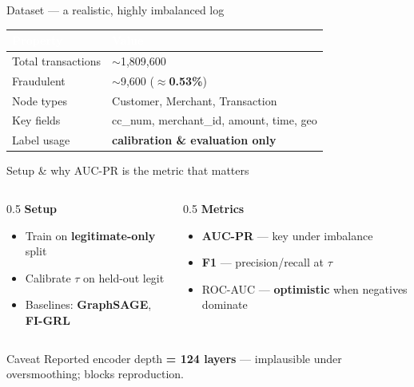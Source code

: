 \documentclass[10pt,aspectratio=169]{beamer}
\newcommand{\hl}[1]{\textcolor{mBlue}{\textbf{#1}}}    %
\newcommand{\bl}[1]{\textcolor{mDark}{\textbf{#1}}}    %
\newcommand{\gr}[1]{\textcolor{mGreen}{\textbf{#1}}}   %
\newcommand{\rd}[1]{\textcolor{mRed}{\textbf{#1}}}     %
\newenvironment{caveat}{\begin{alertblock}{Caveat}}{\end{alertblock}}
\begin{document}
\begin{frame}{Dataset --- a realistic, highly imbalanced log}
  \centering
  \begin{tabular}{ll}
    \arrayrulecolor{mDark}\toprule
    \rowcolor{mDark}\textcolor{white}{\textbf{Property}} & \textcolor{white}{\textbf{Value}}\\
    \midrule
    \rowcolor{mBlue!8} Total transactions & $\sim$1{,}809{,}600\\
    Fraudulent & $\sim$9{,}600 \;(\rd{$\approx$0.53\%})\\
    \rowcolor{mBlue!8} Node types & Customer, Merchant, Transaction\\
    Key fields & cc\_num, merchant\_id, amount, time, geo\\
    \rowcolor{mBlue!8} Label usage & \hl{calibration \& evaluation only}\\
    \bottomrule
  \end{tabular}
\end{frame}

\begin{frame}{Setup \& why AUC-PR is the metric that matters}
  \begin{columns}[T]
    \begin{column}{0.5\textwidth}
      \textbf{Setup}
      \begin{itemize}\footnotesize
        \item Train on \gr{legitimate-only} split
        \item Calibrate $\tau$ on held-out legit
        \item Baselines: \bl{GraphSAGE}, \bl{FI-GRL}
      \end{itemize}
    \end{column}
    \begin{column}{0.5\textwidth}
      \textbf{Metrics}
      \begin{itemize}\footnotesize
        \item \hl{AUC-PR} --- key under imbalance
        \item \hl{F1} --- precision/recall at $\tau$
        \item ROC-AUC --- \rd{optimistic} when negatives dominate
      \end{itemize}
    \end{column}
  \end{columns}
  \vspace{0.2em}
  \begin{caveat}
    Reported encoder depth \rd{= 124 layers} --- implausible under oversmoothing; blocks reproduction.
  \end{caveat}
\end{frame}
\end{document}
